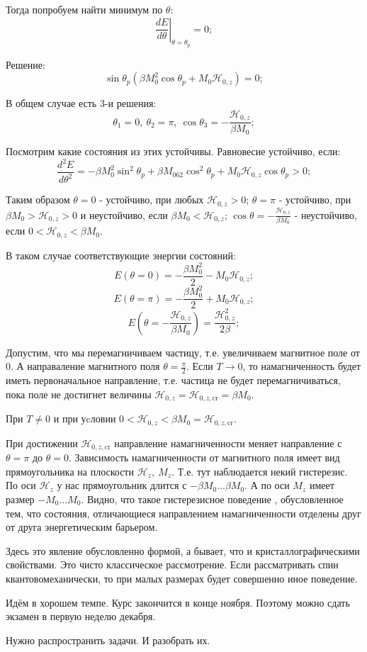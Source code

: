 \documentclass[a4paper, 14pt, russian]{article}
\newcommand{\be}{\begin{equation}}
\newcommand{\ee}{\end{equation}}
\begin{document}
	Тогда попробуем найти минимум по $\theta$:
	\be
		\left.\frac{dE}{d\theta}\right\rvert_{\theta  = \theta_p} = 0;
	\ee

	Решение:
	\be
		\sin \theta_p (\beta M_0^2 \cos \theta_p + M_0 \mathcal{H}_{0,z}) = 0;
	\ee

	В общем случае есть 3-и решения:
	\be
		\theta_1 = 0,~\theta_2 = \pi,~ 
			\cos \theta_3 = - \frac{\mathcal{H}_{0,z}}{\beta M_0};
	\ee

	Посмотрим какие состояния из этих устойчивы. Равновесие устойчиво, если:
	\be
		\frac{d^2 E}{d\theta^2} = - \beta M_0^2 \sin^2 \theta_p  + 
			\beta M_062 \cos^2 \theta_p + M_0 \mathcal{H}_{0,z} \cos \theta_p > 0;
	\ee

	Таким образом $\theta = 0$ - устойчиво, при любых $\mathcal{H}_{0,z} > 0$;
	$\theta= \pi$ -  устойчиво, при $\beta M_0 > \mathcal{H}_{0,z} > 0$ и 
	неустойчиво, если $\beta M_0 < \mathcal{H}_{0,z}$;
	$\cos \theta =  - \frac{\mathcal{H}_{0,z}}{\beta M_0}$ - неустойчиво, если
	$0 < \mathcal{H}_{0,z} < \beta M_0$.

	В таком случае соответствующие энергии состояний:
	\be
		E(\theta = 0) = - \frac{\beta M_0^2 }{2} - M_0 \mathcal{H}_{0,z};
	\ee
	\be
		E(\theta = \pi) = - \frac{\beta M_0^2 }{2} + M_0 \mathcal{H}_{0,z};
	\ee
	\be
		E(\theta =  -\frac{\mathcal{H}_{0, z}}{\beta M_0}) = \frac{\mathcal{H}_{0,z}^2 }{2\beta};
	\ee

	Допустим, что мы перемагничиваем частицу, т.е.
	увеличиваем магнитное поле от 0. А направаление
	магнитного поля $\theta  = \frac{\pi}{2}$. 
	Если $T \rightarrow 0$, то намагниченность будет иметь первоначальное
	направление, т.е. частица не будет перемагничиваться, пока поле не достигнет 
	величины $\mathcal{H}_{0, z} = \mathcal{H}_{0,z,\text{cr}} = \beta M_0$.

	При  $T \neq 0$  и при уcловии 
	$0 < \mathcal{H}_{0,z} < \beta M_0 = \mathcal{H}_{0,z,\text{cr}}$.

	При достижении $\mathcal{H}_{0,z,\text{cr}}$ направление намагниченности меняет направление
	с $\theta = \pi$ до $\theta  = 0$. Зависимость намагниченности от магнитного поля имеет вид
	прямоугольника на плоскости $\mathcal{H}_{z},~M_z$. Т.е. тут наблюдается некий гистерезис.
	По оси $\mathcal{H}_z$ у нас прямоугольник длится с $-\beta M_0 \hdots \beta M_0$.
	А по оси $M_z$ имеет размер $-M_0 \hdots M_0$. Видно, что такое гистерезисное поведение
	, обусловленное тем, что состояния, отличающиеся направлением намагниченности отделены друг
	от друга энергетическим барьером.

	Здесь это явление обусловленно формой, а бывает, что и кристаллографическими свойствами.
	Это чисто классическое рассмотрение. Если рассматривать спин квантовомеханически, 
	то при малых размерах будет совершенно иное поведение.

	\begin{tcolorbox}
		Идём в хорошем темпе. Курс закончится в конце ноября. Поэтому можно сдать экзамен 
		в первую неделю декабря. 

		Нужно распространить задачи. И разобрать их.
	\end{tcolorbox}
\end{document}
